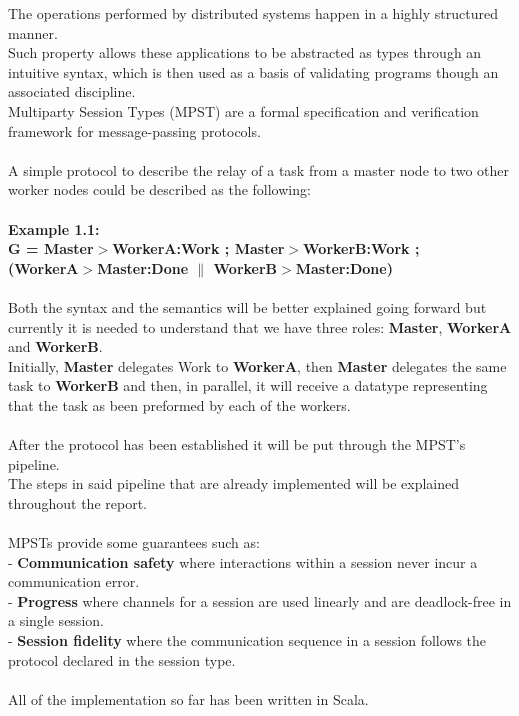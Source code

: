 \normalsize
The operations performed by distributed systems happen in a highly structured manner.\\
Such property allows these applications to be abstracted as types through an intuitive syntax, which is then used as a basis of validating programs though an associated discipline. \cite{honda2008multiparty}\\
Multiparty Session Types (MPST) are a formal specification and verification framework for message-passing protocols. \cite{yoshida2019very}\\
\\
A simple protocol to describe the relay of a task from a master node to two other worker nodes could be described as the following:\\
\\
\textbf{Example 1.1:}\\
\scriptsize
\textbf{G = Master$>$WorkerA:Work ; Master$>$WorkerB:Work ;\\ (WorkerA$>$Master:Done $\|$ WorkerB$>$Master:Done)}\\
\\
\normalsize
Both the syntax and the semantics will be better explained going forward but currently it is needed to understand that we have three roles: \textbf{Master}, \textbf{WorkerA} and \textbf{WorkerB}.\\
Initially, \textbf{Master} delegates Work to \textbf{WorkerA}, then \textbf{Master} delegates the same task to \textbf{WorkerB} and then, in parallel, it will receive a datatype representing that the task as been preformed by each of the workers.\\
\\
After the protocol has been established it will be put through the MPST's pipeline.\\
The steps in said pipeline that are already implemented will be explained throughout the report.\\ 
\\
MPSTs provide some guarantees such as:\\ 
- \textbf{Communication safety} where interactions within a session never incur a communication error.\\
- \textbf{Progress} where channels for a session are used linearly and are deadlock-free in a single session.\\
- \textbf{Session fidelity} where the communication sequence in a session follows the protocol declared in the session type.\\
\\
All of the implementation so far has been written in Scala.\\